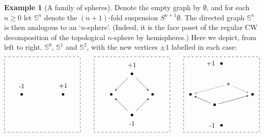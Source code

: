 \documentclass[a4paper, 11 pt, oneside, reqno]{amsart}
\numberwithin{lemma}{section}
\theoremstyle{definition}
\newtheorem{example}[lemma]{Example}
\begin{document}
\begin{example}[A family of spheres]\label{eg:spheres}
    Denote the empty graph by \(\emptyset\), and for each \(n \geq 0\) let \(\mathbb{S}^n\) denote the \((n+1)\)-fold suspension \(S^{n+1} \emptyset\). The directed graph \(\mathbb{S}^n\) is then analogous to an `\(n\)-sphere'.
    (Indeed, it is the face poset of the regular CW decomposition of 
    the topological $n$-sphere by hemispheres.)
    Here we depict, from left to right, \(\mathbb{S}^0\), \(\mathbb{S}^1\) and \(\mathbb{S}^2\), with the new vertices \(\pm 1\) labelled in each case:
    \[
    \begin{tikzpicture}[scale=.9,baseline=0]
        \draw[dashed] (-2.2,2.2) -- (2.2,2.2) -- (2.2,-2.2) -- (-2.2,-2.2) -- (-2.2,2.2);
    
        \node [label={[label distance=.1]90:\small{+1}}] (a) at (0:1.2) {$\bullet$};
        \node [label={[label distance=.1]90:\small{-1}}] (b) at (180:1.2) {$\bullet$};
    \end{tikzpicture}
    \qquad
    \begin{tikzpicture}[scale=.9,baseline=0]
        \draw[dashed] (-2.2,2.2) -- (2.2,2.2) -- (2.2,-2.2) -- (-2.2,-2.2) -- (-2.2,2.2);
        
        \node (a) at (0:1.2) {$\bullet$};
        \node [label={[label distance=.1]90:\small{+1}}] (b) at (90:1.2) {$\bullet$};
        \node (c) at (180:1.2) {$\bullet$};
        \node [label={[label distance=.1]270:\small{-1}}] (d) at (270:1.2) {$\bullet$};

        \draw[stealth-] (a) -- (b);
        \draw[stealth-] (c) -- (b);
        \draw[stealth-] (a) -- (d);
        \draw[stealth-] (c) -- (d);
    \end{tikzpicture}
    \qquad
    \begin{tikzpicture}[scale=.9,baseline=0]
        \draw[dashed] (-2.2,2.2) -- (2.2,2.2) -- (2.2,-2.2) -- (-2.2,-2.2) -- (-2.2,2.2);
        
        \node (a) at (0:1.8) {$\bullet$};
        \node [gray] (b) at (.4,.6) {$\bullet$};
        \node (c) at (180:1.8) {$\bullet$};
        \node (d) at (-.4,-.6) {$\bullet$};
        \node [label={[label distance=.1]180:\small{+1}}] (e) at (90:1.8) {$\bullet$};
        \node [label={[label distance=.1]180:\small{-1}}] (f) at (270:1.8) {$\bullet$};

        \draw[gray, stealth-] (a) -- (b);
        \draw[gray, stealth-] (c) -- (b);
        \draw[stealth-] (a) -- (d);
        \draw[stealth-] (c) -- (d);
        

\end{tikzpicture}\]
\end{example}
\end{document}
